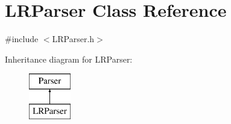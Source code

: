 \hypertarget{classLRParser}{\section{L\-R\-Parser Class Reference}
\label{classLRParser}
}


{\ttfamily \#include $<$L\-R\-Parser.\-h$>$}

Inheritance diagram for L\-R\-Parser\-:\begin{figure}[H]
\begin{center}
\leavevmode
\includegraphics[height=2.000000cm]{d6/de9/classLRParser}
\end{center}
\end{figure}
